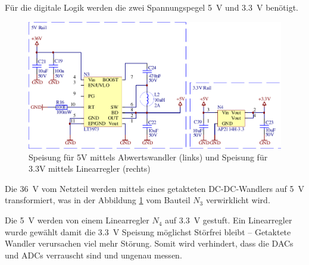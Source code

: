 F\"ur die digitale  Logik  werden  die  zwei  Spannungspegel  \SI{5}{\volt}  und
\SI{3.3}{\volt} ben\"otigt.

\begin{figure}[th!]
    \center
    \includegraphics[width=.75\textwidth]{images/circuit/5v-3v-rails.pdf}
    \caption{Speisung f\"ur 5V mittels Abwertswandler (links) und Speisung f\"ur 3.3V mittels Linearregler (rechts)}
    \label{fig:circuit:rails}
\end{figure}

Die  \SI{36}{\volt} vom Netzteil werden mittels eines getakteten  DC-DC-Wandlers
auf \SI{5}{\volt} transformiert,  was  in  der Abbildung \ref{fig:circuit:rails}
vom Bauteil $N_3$ verwirklicht wird.

Die  \SI{5}{\volt}  werden  von  einem  Linearregler  $N_4$ auf  \SI{3.3}{\volt}
gestuft. Ein Linearregler wurde  gew\"ahlt  damit  die  \SI{3.3}{\volt} Speisung
m\"oglichst  St\"orfrei  bleibt  --  Getaktete  Wandler  verursachen  viel  mehr
St\"orung. Somit  wird  verhindert,  dass  die DACs und ADCs verrauscht sind und
ungenau messen.
